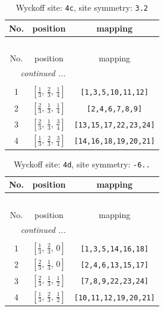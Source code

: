 \documentclass[fleqn,8pt]{jsarticle}
\begin{document}
\renewcommand{\arraystretch}{1.2}
\begin{longtable}{ccc}
\caption{Wyckoff site: {\tt 4c}, site symmetry: {\tt 3.2}}
 \\
 \hline \hline
No. & position & mapping \\ \hline \endfirsthead

\multicolumn{2}{l}{\tablename\ \thetable{}} \\
 \hline \hline
No. & position & mapping \\ \hline \endhead

 \hline \hline
\multicolumn{2}{r}{\footnotesize\it continued ...} \\ \endfoot

 \hline \hline
\multicolumn{2}{r}{} \\ \endlastfoot

1 & $\left[ \frac{1}{3},\, \frac{2}{3},\, \frac{1}{4} \right]$ & {\tt [1,3,5,10,11,12]} \\ \hline
2 & $\left[ \frac{2}{3},\, \frac{1}{3},\, \frac{1}{4} \right]$ & {\tt [2,4,6,7,8,9]} \\ \hline
3 & $\left[ \frac{2}{3},\, \frac{1}{3},\, \frac{3}{4} \right]$ & {\tt [13,15,17,22,23,24]} \\ \hline
4 & $\left[ \frac{1}{3},\, \frac{2}{3},\, \frac{3}{4} \right]$ & {\tt [14,16,18,19,20,21]} \\
\end{longtable}
\renewcommand{\arraystretch}{1.2}
\begin{longtable}{ccc}
\caption{Wyckoff site: {\tt 4d}, site symmetry: {\tt -6..}}
 \\
 \hline \hline
No. & position & mapping \\ \hline \endfirsthead

\multicolumn{2}{l}{\tablename\ \thetable{}} \\
 \hline \hline
No. & position & mapping \\ \hline \endhead

 \hline \hline
\multicolumn{2}{r}{\footnotesize\it continued ...} \\ \endfoot

 \hline \hline
\multicolumn{2}{r}{} \\ \endlastfoot

1 & $\left[ \frac{1}{3},\, \frac{2}{3},\, 0 \right]$ & {\tt [1,3,5,14,16,18]} \\ \hline
2 & $\left[ \frac{2}{3},\, \frac{1}{3},\, 0 \right]$ & {\tt [2,4,6,13,15,17]} \\ \hline
3 & $\left[ \frac{2}{3},\, \frac{1}{3},\, \frac{1}{2} \right]$ & {\tt [7,8,9,22,23,24]} \\ \hline
4 & $\left[ \frac{1}{3},\, \frac{2}{3},\, \frac{1}{2} \right]$ & {\tt [10,11,12,19,20,21]} \\
\end{longtable}
\end{document}
